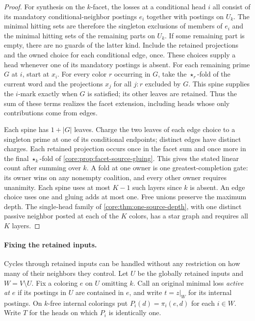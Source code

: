 \begin{proof}
For synthesis on the $k$-facet, the losses at a conditional head $i$
all consist of its mandatory conditional-neighbor postings $e_i$
together with postings on $U_k$. The minimal hitting sets are
therefore the singleton exclusions of members of $e_i$ and the
minimal hitting sets of the remaining parts on $U_k$. If some
remaining part is empty, there are no guards of the latter kind.
Include the retained projections and the owned choice for each
conditional edge, once. These choices supply a head whenever one
of its mandatory postings is absent. For each remaining prime $G$
at $i$, start at $x_i$. For every color $r$ occurring in $G$, take
the $\star_r$-fold of the current word and the projections $x_j$ for
all $j:r$ excluded by $G$. This spine supplies the $i$-mark exactly
when $G$ is satisfied; its other leaves are retained. Thus the sum
of these terms realizes the facet extension, including heads whose
only contributions come from edges.

Each spine has $1+|G|$ leaves. Charge the two leaves of each
edge choice to a singleton prime at one of its conditional endpoints;
distinct edges have distinct charges. Each retained projection
occurs once in the facet sum and once more in the final $\star_k$-fold
of \cref{core:prop:facet-source-gluing}. This gives the stated
linear count after summing over $k$. A fold at one owner is one
greatest-completion gate: its owner wins on any nonempty coalition,
and every other owner requires unanimity. Each spine uses at most
$K-1$ such layers since $k$ is absent. An edge choice uses one
and gluing adds at most one. Free unions preserve the maximum depth.
The single-head family of \cref{core:thm:one-source-depth}, with
one distinct passive neighbor posted at each of the $K$ colors,
has a star graph and requires all $K$ layers.
\end{proof}

\paragraph{Fixing the retained inputs.}
Cycles through retained inputs can be handled without any restriction
on how many of their neighbors they control. Let $U$ be the globally
retained inputs and $W=V\setminus U$. Fix a coloring $e$ on $U$
omitting $k$. Call an original minimal loss \emph{active at $e$} if
its postings in $U$ are contained in $e$, and write $t=z|_W$ for its
internal postings. On $k$-free internal colorings put
$P_i(d)=\pi_i(e,d)$ for each $i\in W$. Write $T$ for the heads on
which $P_i$ is identically one.

